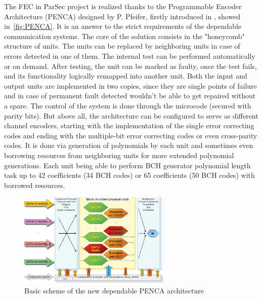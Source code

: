 The FEC in ParSec project is realized thanks to the Programmable Encoder Architecture (PENCA) designed by P. Pfeifer, firstly introduced in \cite{art:Pfeifer}, showed in~\autoref{fig:PENCA}. It is an answer to the strict requirements of the dependable communication systems. The core of the solution consists in the "honeycomb" structure of units. The units can be replaced by neighboring units in case of errors detected in one of them. The internal test can be performed automatically or on demand. After testing, the unit can be marked as faulty, once the test fails, and its functionality logically remapped into another unit. Both the input and output units are implemented in two copies, since they are single points of failure and in case of permanent fault detected wouldn't be able to get repaired without a spare. The control of the system is done through the microcode (secured with parity bits). But above all, the architecture can be configured to serve as different channel encoders, starting with the implementation of the single error correcting codes and ending with the multiple-bit error correcting codes or even cross-parity codes. It is done via generation of polynomials by each unit and sometimes even borrowing resources from neighboring units for more extended polynomial generations. Each unit being able to perform BCH generator polynomial length task up to 42 coefficients (34 BCH codes) or 65 coefficients (50 BCH codes) with borrowed resources.
 \begin{figure}[h]
 \centering
\includegraphics[width=0.65\textwidth]{figures/PENCA.png}
\caption{Basic scheme of the new dependable PENCA architecture~\cite{art:Pfeifer}}
\label{fig:PENCA}
\end{figure}


